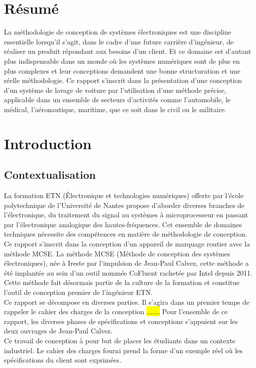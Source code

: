 \vspace*{4cm}
\section*{Résumé}
La méthodologie de conception de systèmes électroniques est une discipline essentielle lorsqu'il s'agit, dans le cadre d'une future carrière d'ingénieur, de réaliser un produit répondant aux besoins d'un client. 
Et ce domaine est d'autant plus indispensable dans un monde où les systèmes numériques sont de plus en plus complexes et leur conceptions demandent une bonne structuration et une réelle méthodologie. 
Ce rapport s'inscrit dans la présentation d'une conception d'un système de lavage de voiture par l'utilisation d'une méthode précise, applicable dans un ensemble de secteurs d'activités comme l'automobile, le médical, l'aéronautique, maritime, que ce soit dans le civil ou le militaire.


\newpage



\section{Introduction}

\subsection{Contextualisation}
La formation ETN (Électronique et technologies numériques) offerte par l'école polytechnique de l'Université de Nantes propose d'aborder diverses branches de l'électronique, du traitement du signal au systèmes à microprocesseur en passant par l'électronique analogique des hautes-fréquences. 
Cet ensemble de domaines techniques nécessite des compétences en matière de méthodologie de conception. Ce rapport s'inscrit dans la conception d'un appareil de marquage routier avec la méthode MCSE. 
La méthode MCSE (Méthode de conception des systèmes électroniques), née à Ireste par l'impulsion de Jean-Paul Calvez, cette méthode a été implantée au sein d'un outil nommée CoFluent rachetée par Intel\mbox{\textregistered } depuis 2011. Cette méthode fait désormais partie de la culture de la formation et constitue l'outil de conception premier de l'ingénieur ETN.\\
Ce rapport se décompose en diverses parties. 
Il s'agira dans un premier temps de rappeler le cahier des charges de la conception \hl{.......} %
Pour l'ensemble de ce rapport, les diverses phases de spécifications et conceptions s'appuient sur les deux ouvrages de Jean-Paul Calvez. \cite{Calvez_1} \cite{Calvez_2} \\
Ce travail de conception à pour but de placer les étudiants dans un contexte industriel. Le cahier des charges fourni prend la forme d'un exemple réel où les spécifications du client sont exprimées.

